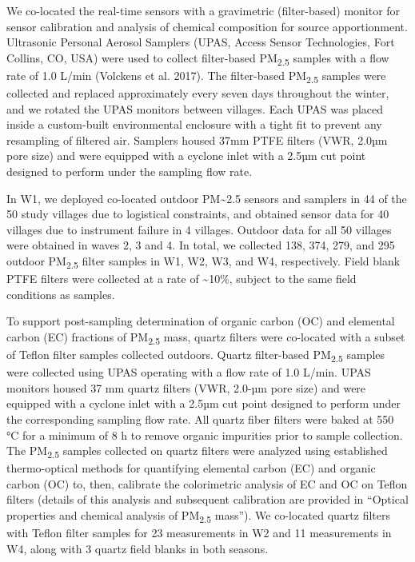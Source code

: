 \documentclass[
  letterpaper,
  DIV=11,
  numbers=noendperiod]{scrartcl}
\begin{document}
We co-located the real-time sensors with a gravimetric
(filter-based) monitor for sensor calibration and analysis of chemical
composition for source apportionment. Ultrasonic Personal Aerosol
Samplers (UPAS, Access Sensor Technologies, Fort Collins, CO, USA) were
used to collect filter-based PM\textsubscript{2.5} samples with a flow
rate of 1.0 L/min (Volckens et al. 2017). The filter-based
PM\textsubscript{2.5} samples were collected and replaced approximately
every seven days throughout the winter, and we rotated the UPAS monitors
between villages. Each UPAS was placed inside a custom-built
environmental enclosure with a tight fit to prevent any resampling of
filtered air. Samplers housed 37mm PTFE filters (VWR, 2.0µm pore size)
and were equipped with a cyclone inlet with a 2.5µm cut point designed
to perform under the sampling flow rate.

In W1, we deployed co-located outdoor PM\textasciitilde2.5 sensors and
samplers in 44 of the 50 study villages due to logistical constraints,
and obtained sensor data for 40 villages due to instrument failure in 4
villages. Outdoor data for all 50 villages were obtained in waves 2, 3
and 4. In total, we collected 138, 374, 279, and 295 outdoor
PM\textsubscript{2.5} filter samples in W1, W2, W3, and W4,
respectively. Field blank PTFE filters were collected at a rate of
\textasciitilde10\%, subject to the same field conditions as samples.

To support post-sampling determination of organic carbon (OC) and
elemental carbon (EC) fractions of PM\textsubscript{2.5} mass, quartz
filters were co-located with a subset of Teflon filter samples collected
outdoors. Quartz filter-based PM\textsubscript{2.5} samples were
collected using UPAS operating with a flow rate of 1.0 L/min. UPAS
monitors housed 37 mm quartz filters (VWR, 2.0-µm pore size) and were
equipped with a cyclone inlet with a 2.5µm cut point designed to perform
under the corresponding sampling flow rate. All quartz fiber filters
were baked at 550 °C for a minimum of 8 h to remove organic impurities
prior to sample collection. The PM\textsubscript{2.5} samples collected
on quartz filters were analyzed using established thermo-optical methods
for quantifying elemental carbon (EC) and organic carbon (OC) to, then,
calibrate the colorimetric analysis of EC and OC on Teflon filters
(details of this analysis and subsequent calibration are provided in
``Optical properties and chemical analysis of PM\textsubscript{2.5}
mass''). We co-located quartz filters with Teflon filter samples for 23
measurements in W2 and 11 measurements in W4, along with 3 quartz field
blanks in both seasons.
\end{document}
